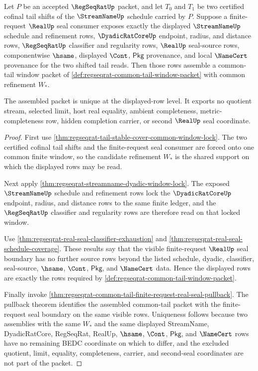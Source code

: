 \begin{theorem}
\label{thm:regseqrat-common-tail-visible-packet-assembly}
Let $P$ be an accepted $\RegSeqRatUp$ packet, and let $T_0$ and $T_1$ be two certified cofinal tail shifts of the $\StreamNameUp$ schedule carried by $P$. Suppose a finite-request $\RealUp$ seal consumer exposes exactly the displayed $\StreamNameUp$ schedule and refinement rows, $\DyadicRatCoreUp$ endpoint, radius, and distance rows, $\RegSeqRatUp$ classifier and regularity rows, $\RealUp$ seal-source rows, componentwise $\hsame$, displayed $\Cont$, $\mathsf{Pkg}$ provenance, and local $\NameCert$ provenance for the two shifted tail reads. Then those rows assemble a common-tail window packet of \autoref{def:regseqrat-common-tail-window-packet} with common refinement $W_\ast$.

The assembled packet is unique at the displayed-row level. It exports no quotient stream, selected limit, host real equality, ambient completeness, metric-completeness row, hidden completion carrier, or second $\RealUp$ seal coordinate.
\end{theorem}
\begin{proof}
First use \autoref{thm:regseqrat-tail-stable-cover-common-window-lock}. The two certified cofinal tail shifts and the finite-request seal consumer are forced onto one common finite window, so the candidate refinement $W_\ast$ is the shared support on which the displayed rows may be read.

Next apply \autoref{thm:regseqrat-streamname-dyadic-window-lock}. The exposed $\StreamNameUp$ schedule and refinement rows lock the $\DyadicRatCoreUp$ endpoint, radius, and distance rows to the same finite ledger, and the $\RegSeqRatUp$ classifier and regularity rows are therefore read on that locked window.

Use \autoref{thm:regseqrat-real-seal-classifier-exhaustion} and \autoref{thm:regseqrat-real-seal-schedule-coverage}. These results say that the visible finite-request $\RealUp$ seal boundary has no further source rows beyond the listed schedule, dyadic, classifier, seal-source, $\hsame$, $\Cont$, $\mathsf{Pkg}$, and $\NameCert$ data. Hence the displayed rows are exactly the rows required by \autoref{def:regseqrat-common-tail-window-packet}.

Finally invoke \autoref{thm:regseqrat-common-tail-finite-request-real-seal-pullback}. The pullback theorem identifies the assembled common-tail packet with the finite-request seal boundary on the same visible rows. Uniqueness follows because two assemblies with the same $W_\ast$ and the same displayed StreamName, DyadicRatCore, RegSeqRat, RealUp, $\hsame$, $\Cont$, $\mathsf{Pkg}$, and $\NameCert$ rows have no remaining BEDC coordinate on which to differ, and the excluded quotient, limit, equality, completeness, carrier, and second-seal coordinates are not part of the packet.
\end{proof}

